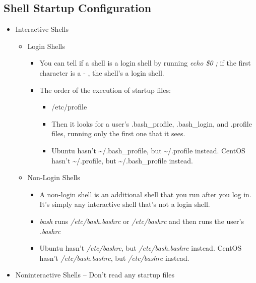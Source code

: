 \documentclass[titlepage]{article}
\begin{document}
      \subsection{Shell Startup Configuration}
        \begin{itemize}
        	\item Interactive Shells
        	  \begin{itemize}
        	  	\item Login Shells
        	  	  \begin{itemize}
        	  	  	\item You can tell if a shell is a login shell by running \emph{echo \$0 ;} if the first character is a - , the shell’s a login shell.
        	  	  	\item The order of the execution of startup files:
        	  	  	  \begin{itemize}
        	  	  	  	\item /etc/profile
        	  	  	  	\item Then it looks for a user’s .bash\_profile, .bash\_login, and .profile files, running only the first one that it sees.
        	  	  	  	\item Ubuntu hasn't \textasciitilde/.bash\_profile, but \textasciitilde/.profile instead. CentOS hasn't \textasciitilde/.profile, but \textasciitilde/.bash\_profile instead.
        	  	  	  \end{itemize}
        	  	  \end{itemize}
          	    \item Non-Login Shells
          	      \begin{itemize}
          	      	\item A non-login shell is an additional shell that you run after you log in. It’s
          	      	simply any interactive shell that’s not a login shell.
          	      	\item \emph{bash} runs \emph{/etc/bash.bashrc} or \emph{/etc/bashrc} and then runs the user’s \emph{.bashrc}
          	      	\item Ubuntu hasn't \emph{/etc/bashrc}, but \emph{/etc/bash.bashrc} instead. CentOS hasn't \emph{/etc/bash.bashrc}, but \emph{/etc/bashrc} instead.
          	      \end{itemize}
        	  \end{itemize}
        	\item Noninteractive Shells -- Don't read any startup files
        \end{itemize}
\end{document}
